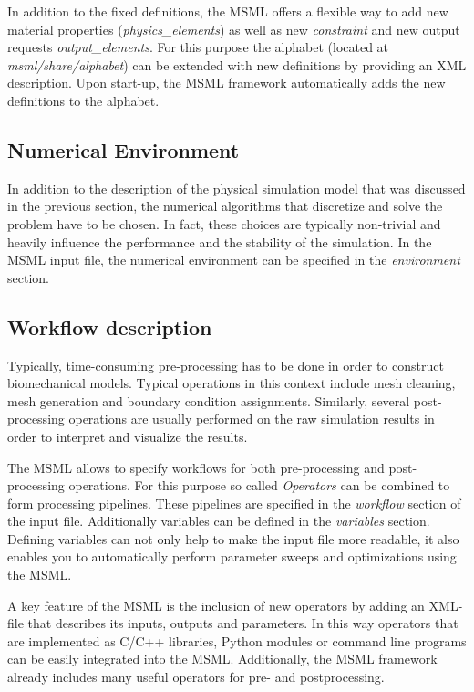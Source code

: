 In addition to the fixed definitions, the MSML offers a flexible way to add new material properties (\emph{physics\_elements}) as well as new \emph{constraint} and new output requests \emph{output\_elements}. For this purpose the alphabet (located at \emph{msml/share/alphabet}) can be extended with new definitions by providing an XML description. Upon start-up, the MSML framework automatically adds the new definitions to the alphabet. 

\subsection{Numerical Environment}

In addition to the description of the physical simulation model that was discussed in the previous section, the numerical algorithms that discretize and solve the problem have to be chosen. In fact, these choices are typically non-trivial and heavily influence the performance and the stability of the simulation. In the MSML input file, the numerical environment can be specified in the \emph{environment} section.


\subsection{Workflow description}

Typically, time-consuming pre-processing has to be done in order to construct biomechanical models. Typical operations in this context include mesh cleaning, mesh generation and boundary condition assignments. Similarly, several post-processing operations are usually performed on the raw simulation results in order to interpret and visualize the results. 

The MSML allows to specify workflows for both pre-processing and post-processing operations. For this purpose so called \emph{Operators} can be combined to form processing pipelines. These pipelines are specified in the \emph{workflow} section of the input file. Additionally variables can be defined in the \emph{variables} section. Defining variables can not only help to make the input file more readable, it also enables you to automatically perform parameter sweeps and optimizations using the MSML.

A key feature of the MSML is the inclusion of new operators by adding an XML-file that describes its inputs, outputs and parameters. In this way operators that are implemented as C/C++ libraries, Python modules or command line programs can be easily integrated into the MSML. Additionally, the MSML framework already includes many useful operators for pre- and postprocessing.

